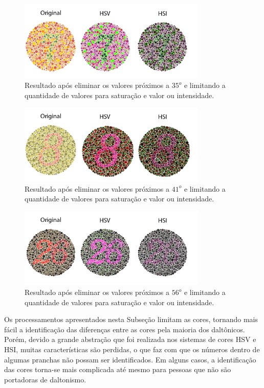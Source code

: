 \documentclass[	12pt, Times, openright, twoside, a4paper, english, brazil]{abntex2}
\begin{document}
\begin{figure}[!htb]
\centering \includegraphics[width=0.8\textwidth]{figuraHistograma.png}
\caption{Resultado após eliminar os valores próximos a $35^o$ e limitando a quantidade de valores para saturação e valor ou intensidade.}  \label{fig:figuraHistogramaHSV}
\end{figure}

\begin{figure}[!htb]
\centering \includegraphics[width=0.8\textwidth]{figuraHistograma2.png}
\caption{Resultado após eliminar os valores próximos a $41^o$ e limitando a quantidade de valores para saturação e valor ou intensidade.} \label{fig:figuraHistogramaHSV2}
\end{figure}

\begin{figure}[!htb]
\centering \includegraphics[width=0.8\textwidth]{figuraHistograma3.png}
\caption{Resultado após eliminar os valores próximos a $56^o$ e limitando a quantidade de valores para saturação e valor ou intensidade.} \label{fig:figuraHistogramaHSV3}
\end{figure}

Os processamentos apresentados nesta Subseção limitam as cores, tornando mais fácil a identificação das diferenças entre as cores pela maioria dos daltônicos. Porém, devido a grande abstração que foi realizada nos sistemas de cores HSV e HSI, muitas características são perdidas, o que faz com que os números dentro de algumas pranchas não possam ser identificados. Em alguns casos, a identificação das cores torna-se mais complicada até mesmo para pessoas que não são portadoras de daltonismo.
\end{document}
